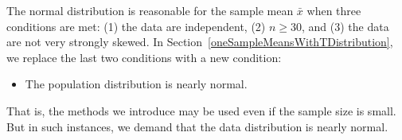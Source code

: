 The normal distribution is reasonable for the sample mean $\bar{x}$ when three conditions are met: (1) the data are independent, (2) $n\geq 30$, and (3) the data are not very strongly skewed. In Section~\ref{oneSampleMeansWithTDistribution}, we replace the last two conditions with a new condition:
\begin{itemize}
\item The population distribution is nearly normal.
\end{itemize}
That is, the methods we introduce may be used even if the sample size is small. But in such instances, we demand that the data distribution is nearly normal.



%

